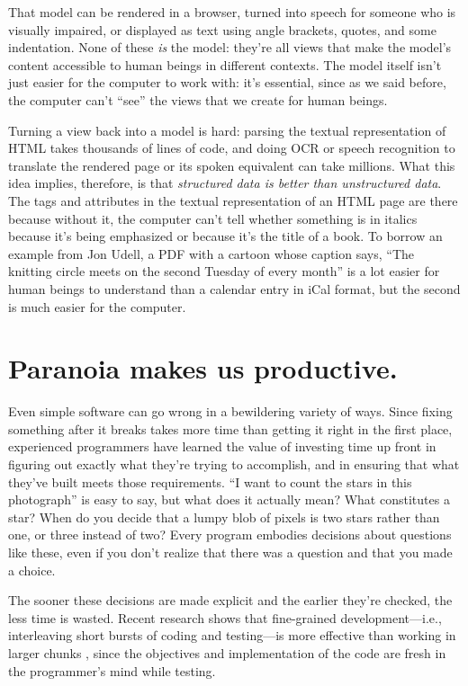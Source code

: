 \documentclass[10pt,letterpaper]{article}
\newcommand{\rulemajor}[1]{\section{#1}}
\begin{document}
That model can be rendered in a browser, turned into speech for someone who is
visually impaired, or displayed as text using angle brackets, quotes, and some
indentation.  None of these \emph{is} the model: they're all views that make the
model's content accessible to human beings in different contexts.  The model
itself isn't just easier for the computer to work with: it's essential, since as
we said before, the computer can't ``see'' the views that we create for human
beings.

Turning a view back into a model is hard: parsing the textual representation of
HTML takes thousands of lines of code, and doing OCR or speech recognition to
translate the rendered page or its spoken equivalent can take millions.  What
this idea implies, therefore, is that \emph{structured data is better than
  unstructured data}.  The tags and attributes in the textual representation of
an HTML page are there because without it, the computer can't tell whether
something is in italics because it's being emphasized or because it's the title
of a book.  To borrow an example from Jon Udell, a PDF with a cartoon whose
caption says, ``The knitting circle meets on the second Tuesday of every month''
is a lot easier for human beings to understand than a calendar entry in iCal
format, but the second is much easier for the computer.

\rulemajor{Paranoia makes us productive.}

Even simple software can go wrong in a bewildering variety of ways.  Since
fixing something after it breaks takes more time than getting it right in the
first place, experienced programmers have learned the value of investing time up
front in figuring out exactly what they're trying to accomplish, and in ensuring
that what they've built meets those requirements.  ``I want to count the stars
in this photograph'' is easy to say, but what does it actually mean?  What
constitutes a star?  When do you decide that a lumpy blob of pixels is two stars
rather than one, or three instead of two?  Every program embodies decisions
about questions like these, even if you don't realize that there was a question
and that you made a choice.

The sooner these decisions are made explicit and the earlier they're checked,
the less time is wasted.  Recent research shows that fine-grained
development---i.e., interleaving short bursts of coding and testing---is more
effective than working in larger chunks \cite{Fucc2017}, since the objectives
and implementation of the code are fresh in the programmer's mind while testing.
\end{document}
